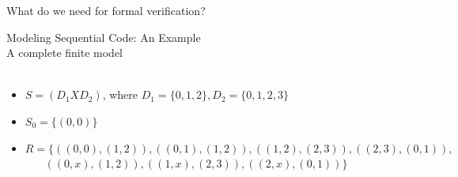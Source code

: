 \documentclass{beamer}
\begin{document}
\begin{frame}{What do we need for formal verification?}
\begin{frame}{Modeling Sequential Code: An Example \\
\small{A complete finite model}}
\hfill
{} \\
 \\
\begin{itemize}
\item<3-> $S = (D_1 X D_2)$, where $D_1 = \{0,1,2\}, D_2 = \{0,1,2,3\}$
\item<3-> $S_0 = \{(0,0)\}$
\item<3-> $R = \{ ((0,0),(1,2)), ((0,1),(1,2)), ((1,2),(2,3)), ((2,3),(0,1)),$ \\
$~~~~~~~~((0,x), (1,2)), ((1,x), (2,3)), ((2,x), (0,1))\}$
\end{itemize}
\end{frame}


\end{frame}
\end{document}

